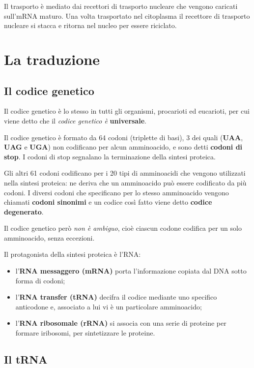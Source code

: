 \documentclass[11pt]{book}
\begin{document}
Il trasporto è mediato dai recettori di trasporto nucleare che vengono
caricati sull'mRNA maturo. Una volta trasportato nel citoplasma il
recettore di trasporto nucleare si stacca e ritorna nel nucleo per
essere riciclato.

\chapter{La traduzione}\label{la-traduzione}

\section{Il codice genetico}\label{il-codice-genetico}

Il codice genetico è lo stesso in tutti gli organismi, procarioti ed
eucarioti, per cui viene detto che il \emph{codice genetico è}
\textbf{universale}.

Il codice genetico è formato da 64 codoni (triplette di basi), 3 dei
quali (\textbf{UAA}, \textbf{UAG} e \textbf{UGA}) non codificano per
alcun amminoacido, e sono detti \textbf{codoni di stop}. I codoni di
stop segnalano la terminazione della sintesi proteica.

Gli altri 61 codoni codificano per i 20 tipi di amminoacidi che vengono
utilizzati nella sintesi proteica: ne deriva che un amminoacido può
essere codificato da più codoni. I diversi codoni che specificano per lo
stesso amminoacido vengono chiamati \textbf{codoni sinonimi} e un codice
così fatto viene detto \textbf{codice degenerato}.

Il codice genetico però \emph{non è ambiguo}, cioè ciascun codone
codifica per un solo amminoacido, senza eccezioni.

Il protagonista della sintesi proteica è l'RNA:

\begin{itemize}
\itemsep1pt\parskip0pt
\item
  l'\textbf{RNA messaggero (mRNA)} porta l'informazione copiata dal DNA
  sotto forma di codoni;
\item
  l'\textbf{RNA transfer (tRNA)} decifra il codice mediante uno
  specifico anticodone e, associato a lui vi è un particolare
  amminoacido;
\item
  l'\textbf{RNA ribosomale (rRNA)} si associa con una serie di proteine
  per formare iribosomi, per sintetizzare le proteine.
\end{itemize}

\section{Il tRNA}\label{il-trna}
\end{document}
